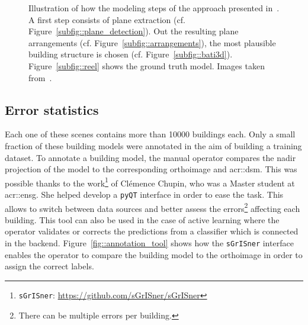 \begin{figure}[htb]
{\begin{subfloatrow}[2]
{{                        }
                    }
                \end{subfloatrow}
            }{
                \caption[
                    Illustration of how the modeling steps of the approach presented in~\parencite{durupt2006automatic}.
                ]{
                    \label{fig::method_modeling}
                    Illustration of how the modeling steps of the approach presented in~\parencite{durupt2006automatic}.
                    A first step consists of plane extraction (cf. Figure~\ref{subfig::plane_detection}).
                    Out the resulting plane arrangements (cf. Figure~\ref{subfig::arrangements}), the most plausible building structure is chosen (cf. Figure~\ref{subfig::bati3d}).
                    Figure~\ref{subfig::reel} shows the ground truth model.
                    Images taken from~\parencite{bredif20103d}.
                }
            }
        \end{figure}

    \subsection{Error statistics}
        \label{subsec::experiments::datasets::stats}
        Each one of these scenes contains more than \num{10000} buildings each.
        Only a small fraction of these building models were annotated in the aim of building a training dataset.
        To annotate a building model, the manual operator compares the nadir projection of the model to the corresponding orthoimage and \gls{acr::dsm}.
        This was possible thanks to the work\footnote{\verb!sGrISner!: \href{https://github.com/CHUPClem/sGrISner}{\url{https://github.com/sGrISner/sGrISner}}} of Clémence Chupin, who was a Master student at \gls{acr::ensg}.
        She helped develop a \verb!pyQT! interface in order to ease the task.
        This allows to switch between data sources and better assess the errors\footnote{There can be multiple errors per building.} affecting each building.
        This tool can also be used in the case of active learning where the operator validates or corrects the predictions from a classifier which is connected in the backend.
        Figure~\ref{fig::annotation_tool} shows how the \verb!sGrISner! interface enables the operator to compare the building model to the orthoimage in order to assign the correct labels.\\

